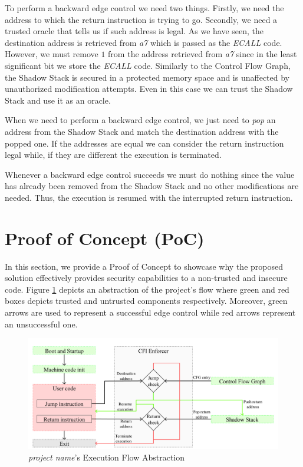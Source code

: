 To perform a backward edge control we need two things. Firstly, we need the address
to which the return instruction is trying to go. Secondly, we need a trusted oracle
that tells us if such address is legal. As we have seen, the destination address
is retrieved from \textit{a7} which is passed as the \textit{ECALL} code.
However, we must remove $1$ from the address retrieved from \textit{a7} since in
the least significant bit we store the \textit{ECALL} code. Similarly to the
Control Flow Graph, the Shadow Stack is secured in a protected memory space and is
unaffected by unauthorized modification attempts. Even in this case we can trust
the Shadow Stack and use it as an oracle.

When we need to perform a backward edge control, we just need to \textit{pop} an
address from the Shadow Stack and match the destination address with the popped
one. If the addresses are equal we can consider the return instruction legal while,
if they are different the execution is terminated.

Whenever a backward edge control succeeds we must do nothing since the value has
already been removed from the Shadow Stack and no other modifications are needed.
Thus, the execution is resumed with the interrupted return instruction.

\section{Proof of Concept (PoC)}
\label{sec:project_poc}

In this section, we provide a Proof of Concept to showcase why the proposed
solution effectively provides security capabilities to a non-trusted and
insecure code. Figure \ref{fig:functioning} depicts an abstraction of the project's
flow where green and red boxes depicts trusted and untrusted components respectively.
Moreover, green arrows are used to represent a successful edge control while red
arrows represent an unsuccessful one.

\begin{figure}[htbp]
  \centering
  \includegraphics[width=.9\linewidth]{images/functioning.png}
  \caption{\textit{project name}'s Execution Flow Abstraction}
  \label{fig:functioning}
\end{figure}

